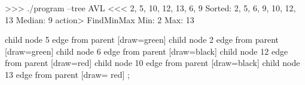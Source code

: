 


\begin{TcblistingMintedTerminal}
>>>  ./program --tree AVL <<< 2, 5, 10, 12, 13, 6, 9
Sorted: 2, 5, 6, 9, 10, 12, 13
Median: 9
action> FindMinMax
Min: 2
Max: 13
\end{TcblistingMintedTerminal}

\begin{TikzTreeStyle}
    child {node {5} edge from parent [draw=green]
      child {node {2} edge from parent [draw=green] }
      child {node {6} edge from parent [draw=black] }
    }
    child {node {12} edge from parent [draw=red]
      child {node {10} edge from parent [draw=black] }
      child {node {13} edge from parent [draw=  red] }
    };
\end{TikzTreeStyle}